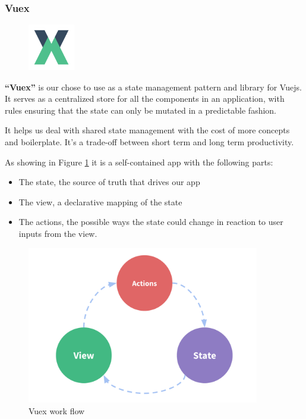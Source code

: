 \documentclass[12pt,a4paper]{report}
\begin{document}
	\subsubsection*{Vuex}
	\begin{figure}
		\centering
		\includegraphics[width=0.8in]{vuex-logo.png}	
		
	\end{figure}
	\textbf{``Vuex''} is our chose to use as a state management pattern and library for Vuejs. It serves as a centralized store for all the components in an application, with rules ensuring that the state can only be mutated in a predictable fashion.\par 
	It helps us deal with shared state management with the cost of more concepts and boilerplate. It's a trade-off between short term and long term productivity.\par
	As showing in Figure \ref{label-vuex} it is a self-contained app with the following parts:
	\begin{itemize}
		\item The state, the source of truth that drives our app
		\item The view, a declarative mapping of the state
		\item The actions, the possible ways the state could change in reaction to user inputs from the view.
		
	\end{itemize}
	\begin{figure}[H]
		\centering
		\includegraphics[width=4in,keepaspectratio]{flow-vuex.png}
		\caption{Vuex work flow}
		\label{label-vuex}
	\end{figure}
\end{document}
